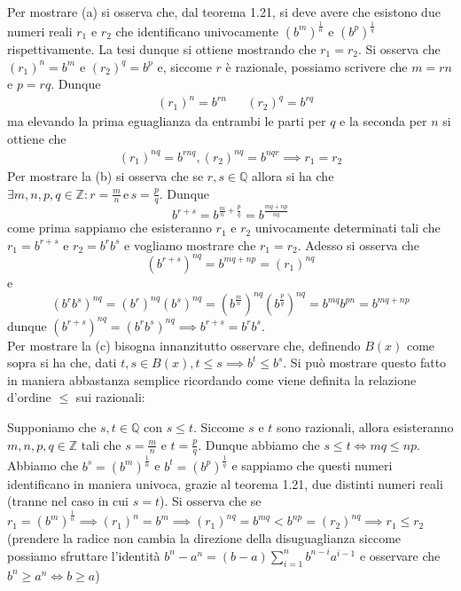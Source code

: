 \documentclass{report}
\begin{document}
\begin{mysolution}
	Per mostrare (a) si osserva che, dal teorema 1.21, si deve avere che esistono due numeri reali $r_1$ e $r_2$ che identificano univocamente $(b^m)^{\frac{1}{n}}$ e $(b^p)^{\frac{1}{q}}$ rispettivamente. La tesi dunque si ottiene mostrando che $r_1 = r_2$. Si osserva che $(r_1)^n = b^m$ e $(r_2)^q = b^p$ e, siccome $r$ è razionale, possiamo scrivere che $m = rn$ e $p = rq$. Dunque
	\begin{align*}
		&(r_1)^n = b^{rn} & &(r_2)^q = b^{rq}
	\end{align*}
	ma elevando la prima eguaglianza da entrambi le parti per $q$ e la seconda per $n$ si ottiene che 
	\begin{align*}
		(r_1)^{nq} = b^{rnq}, (r_2)^{nq} = b^{nqr} \implies r_1 = r_2
	\end{align*}
	Per mostrare la (b) si osserva che se $r,s \in \mathbb{Q}$ allora si ha che $\exists m, n, p, q \in \mathbb{Z}: r=\frac{m}{n} \, \text{e} \, s = \frac{p}{q}$. Dunque
	$$
	b^{r+s} = b^{\frac{m}{n} + \frac{p}{q}} = b^{\frac{mq + np}{nq}}
	$$
	come prima sappiamo che esisteranno $r_1$ e $r_2$ univocamente determinati tali che $r_1 = b^{r+s}$ e $r_2 = b^{r} b^{s}$ e vogliamo mostrare che $r_1 = r_2$. Adesso si osserva che
	$$
		(b^{r+s})^{nq} = b^{mq+np} = (r_1)^{nq}
	$$
	e
	$$
		(b^{r} b^s)^{nq} = (b^{r})^{nq} (b^s)^{nq} = (b^{\frac{m}{n}})^{nq} (b^{\frac{p}{q}})^{nq} = b^{mq} b^{pn} = b^{mq+np}
	$$
	dunque $(b^{r+s})^{nq} = (b^r b^s)^{nq} \implies b^{r+s} = b^r b^s$. \\ Per mostrare la (c) bisogna innanzitutto osservare che, definendo $B(x)$ come sopra si ha che, dati $t, s \in B(x), t \leq s \implies b^t \leq b^s$. Si può mostrare questo fatto in maniera abbastanza semplice ricordando come viene definita la relazione d'ordine $\leq$ sui razionali:
\begin{myproof}
	Supponiamo che $s, t \in \mathbb{Q}$ con $s \leq t$. Siccome $s$ e $t$ sono razionali, allora esisteranno $m, n, p, q \in \mathbb{Z}$ tali che $s = \frac{m}{n}$ e $t = \frac{p}{q}$. Dunque abbiamo che $s \leq t \iff mq \leq np$. Abbiamo che $b^s = (b^m)^{\frac{1}{n}}$ e $b^t = (b^p)^{\frac{1}{q}}$ e sappiamo che questi numeri identificano in maniera univoca, grazie al teorema 1.21, due distinti numeri reali (tranne nel caso in cui $s = t$). Si osserva che se $r_1 = (b^m)^{\frac{1}{n}} \implies (r_1)^{n} = b^m \implies (r_1)^{nq} = b^{mq} < b^{np} = (r_2)^{nq} \implies r_1 \leq r_2$  (prendere la radice non cambia la direzione della disuguaglianza siccome possiamo sfruttare l'identità $b^n - a^n = (b-a)\sum\limits_{i=1}^{n} b^{n-i} a^{i-1}$ e osservare che $b^n \geq a^n \iff b \geq a$) 
\end{myproof}	
	

\end{mysolution}
\end{document}
